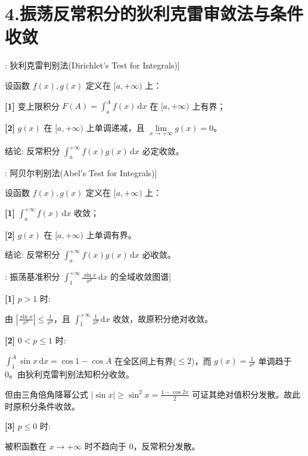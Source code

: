\documentclass[11pt,a4paper,UTF8]{ctexart}
\begin{document}
\section{4.振荡反常积分的狄利克雷审敛法与条件收敛}

\begin{thmbox}[定理[1]: 狄利克雷判别法(Dirichlet's Test for Integrals)]

设函数 $f(x), g(x)$ 定义在 $[a, +\infty)$ 上：

\textbf{[1]} 变上限积分 $F(A) = \int_a^A f(x)\,\mathrm{d}x$ 在 $[a, +\infty)$ 上有界；

\textbf{[2]} $g(x)$ 在 $[a, +\infty)$ 上单调递减，且 $\lim\limits_{x \to +\infty} g(x) = 0$。

结论: 反常积分 $\int_a^{+\infty} f(x)g(x)\,\mathrm{d}x$ 必定收敛。

\end{thmbox}
\begin{thmbox}[定理[2]: 阿贝尔判别法(Abel's Test for Integrals)]

设函数 $f(x), g(x)$ 定义在 $[a, +\infty)$ 上：

\textbf{[1]} $\int_a^{+\infty} f(x)\,\mathrm{d}x$ 收敛；

\textbf{[2]} $g(x)$ 在 $[a, +\infty)$ 上单调有界。

结论: 反常积分 $\int_a^{+\infty} f(x)g(x)\,\mathrm{d}x$ 必收敛。

\end{thmbox}
\begin{thmbox}[模型[1]: 振荡基准积分 $\int_1^{+\infty} \frac{\sin x}{x^p}\,\mathrm{d}x$ 的全域收敛图谱]

\textbf{[1]} $p > 1$ 时:

由 $\left\vert{}\frac{\sin x}{x^p}\right\vert{} \leqslant \frac{1}{x^p}$，且 $\int_1^{+\infty} \frac{1}{x^p}\,\mathrm{d}x$ 收敛，故原积分绝对收敛。

\textbf{[2]} $0 < p \leqslant 1$ 时:

$\int_1^A \sin x\,\mathrm{d}x = \cos 1 - \cos A$ 在全区间上有界($\leqslant 2$)，而 $g(x) = \frac{1}{x^p}$ 单调趋于 0。由狄利克雷判别法知积分收敛。

但由三角倍角降幂公式 $\vert{}\sin x\vert{} \geqslant \sin^2 x = \frac{1-\cos 2x}{2}$ 可证其绝对值积分发散。故此时原积分条件收敛。

\textbf{[3]} $p \leqslant 0$ 时:

被积函数在 $x \to +\infty$ 时不趋向于 0，反常积分发散。

\end{thmbox}
\end{document}
